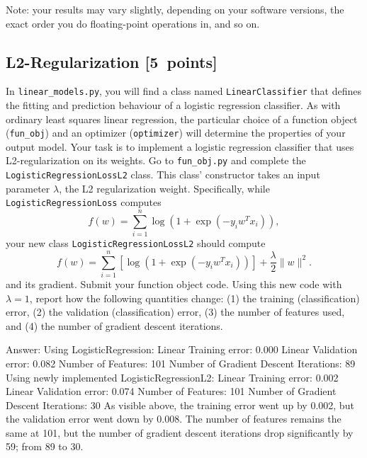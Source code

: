 \documentclass{article}
\newcommand{\blu}[1]{{\textcolor{blu}{#1}}}
\newcommand{\gre}[1]{\textcolor{gre}{#1}}
\newcommand\ans[1]{\par\gre{Answer: #1}}
\let\ask\blu
\newcommand\pts[1]{\textcolor{pointscolour}{[#1~points]}}
\newcommand{\norm}[1]{\lVert #1 \rVert}
\begin{document}
Note: your results may vary slightly, depending on your software versions, the exact order you do floating-point operations in, and so on.


\subsection{L2-Regularization \pts{5}}

In \verb|linear_models.py|, you will find a class named \verb|LinearClassifier| that defines the fitting and prediction behaviour of a logistic regression classifier. As with ordinary least squares linear regression, the particular choice of a function object (\verb|fun_obj|) and an optimizer (\verb|optimizer|) will determine the properties of your output model.
Your task is to implement a logistic regression classifier that uses L2-regularization on its weights. Go to \verb|fun_obj.py| and complete the \verb|LogisticRegressionLossL2| class. This class' constructor takes an input parameter $\lambda$, the L2 regularization weight. Specifically, while \verb|LogisticRegressionLoss| computes
\[
f(w) = \sum_{i=1}^n \log(1+\exp(-y_iw^Tx_i)),
\]
your new class \verb|LogisticRegressionLossL2| should compute
\[
f(w) = \sum_{i=1}^n \left[\log(1+\exp(-y_iw^Tx_i))\right] + \frac{\lambda}{2}\norm{w}^2.
\]
and its gradient.
\ask{Submit your function object code. Using this new code with $\lambda = 1$, report how the following quantities change: (1) the training (classification) error, (2) the validation (classification) error, (3) the number of features used, and (4) the number of gradient descent iterations.}
\newpage
\ans{ \newline Using LogisticRegression: \newline
Linear Training error: 0.000 \newline
Linear Validation error: 0.082 \newline
Number of Features: 101 \newline
Number of Gradient Descent Iterations: 89 \newline \newline
Using newly implemented LogisticRegressionL2:  \newline
Linear Training error: 0.002 \newline
Linear Validation error: 0.074 \newline
Number of Features: 101 \newline
Number of Gradient Descent Iterations: 30 \newline
\newline
As visible above, the training error went up by 0.002, but the validation error went down by 0.008. The number of features remains the same at 101, but the number of gradient descent iterations drop significantly by 59; from 89 to 30.
}
\end{document}
